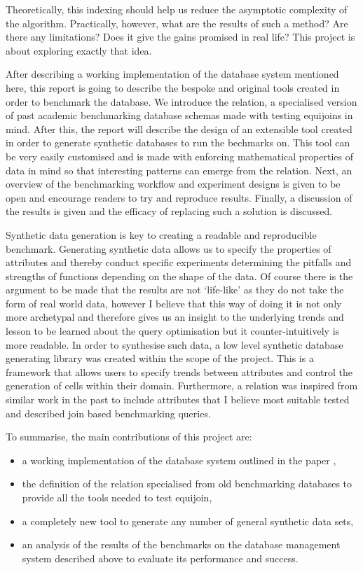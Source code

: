 Theoretically, this indexing should help us reduce the asymptotic complexity of
the algorithm. Practically, however, what are the results of such a method? Are
there any limitations? Does it give the gains promised  in real life? This
project is about exploring exactly that idea.

After describing a working implementation of the database system mentioned here,
this report is going to describe the bespoke and original tools created in order
to benchmark the database. We introduce the  relation, a
specialised version of past academic benchmarking database schemas made with
testing equijoins in mind. After this, the report will describe the design of
an extensible tool created in order to generate synthetic databases to run the
bechmarks on. This tool can be very easily customised and is made with enforcing
mathematical properties of data in mind so that interesting patterns can emerge
from the  relation. Next, an overview of the benchmarking
workflow and experiment designs is given to be open and encourage readers to try
and reproduce results. Finally, a discussion of the results is given and the
efficacy of replacing such a solution is discussed.

Synthetic data generation is key to creating a readable and reproducible
benchmark. Generating synthetic data allows us to specify the properties of
attributes and thereby conduct specific experiments determining the pitfalls and
strengths of functions depending on the shape of the data. Of course there is
the argument to be made that the results are not `life-like' as they do not take
the form of real world data, however I believe that this way of doing it is not
only more archetypal and therefore gives us an insight to the underlying trends
and lesson to be learned about the query optimisation but it counter-intuitively
is more readable. In order to synthesise such data, a low level synthetic
database generating library was created within the scope of the project. This is
a framework that allows users to specify trends between attributes and control
the generation of cells within their domain. Furthermore, a 
relation was inspired from similar work in the past to include attributes that I
believe most suitable tested and described join based benchmarking queries.

To summarise, the main contributions of this project are:
\begin{itemize}
    \item a working implementation of the database system outlined in the paper
        \relalg{},
    \item the definition of the  relation specialised from
        old benchmarking databases to provide all the tools needed to test
        equijoin,
    \item a completely new tool to generate any number of general synthetic data
        sets,
    \item an analysis of the results of the benchmarks on the database
        management system described above to evaluate its performance and
        success.
\end{itemize}

